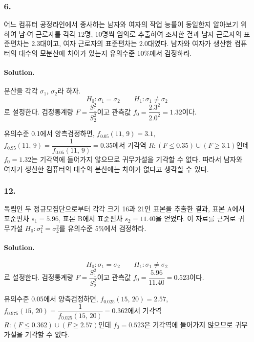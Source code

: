 \subsubsection{6.} 어느 컴퓨터 공정라인에서 종사하는 남자와 여자의 작업 능률이 동일한지 알아보기 위하여 남$\cdot$여 근로자를 각각
12명, 10명씩 임의로 추출하여 조사한 결과 남자 근로자의 표준편차는 2.3대이고, 여자 근로자의 표준편차는 2.0대였다. 남자와 여자가 생산한
컴퓨터의 대수의 모분산에 차이가 있는지 유의수준 10\%에서 검정하라.

\paragraph{Solution.} 분산을 각각 $\sigma_1$, $\sigma_2$라 하자.
\[H_0:\sigma_1=\sigma_2 \qquad H_1:\sigma_1\neq\sigma_2\]
로 설정한다. 검정통계량 $F=\dfrac{S_1^2}{S_2^2}$이고 관측값 $f_0=\dfrac{2.3^2}{2.0^2}=1.32$이다.

유의수준 0.1에서 양측검정하면, $f_{0.05}\left(11,\,9\right)=3.1$, $f_{0.95}\left(11,\,9\right)
=\dfrac{1}{f_{0.05}\left(11,\,9\right)}=0.35$에서
기각역 $R:\left(F\leq 0.35\right) \cup \left(F\geq 3.1\right)$인데
$f_0=1.32$는 기각역에 들어가지 않으므로 귀무가설을 기각할 수 없다. 따라서 남자와 여자가 생산한
컴퓨터의 대수의 분산에는 차이가 없다고 생각할 수 있다.

\subsubsection{12.} 독립인 두 정규모집단으로부터 각각 크기 16과 21인 표본을 추출한 결과, 표본 A에서 표준편차 $s_1=5.96$, 
표본 B에서 표준편차 $s_2=11.40$을 얻었다. 이 자료를 근거로 귀무가설 $H_0:\sigma_1^2=\sigma_2^2$를 유의수준 5\%에서 검정하라.

\paragraph{Solution.}
\[H_0:\sigma_1=\sigma_2 \qquad H_1:\sigma_1\neq\sigma_2\]
로 설정한다. 검정통계량 $F=\dfrac{S_1^2}{S_2^2}$이고 관측값 $f_0=\dfrac{5.96}{11.40}=0.523$이다.

유의수준 0.05에서 양측검정하면, $f_{0.025}\left(15,\,20\right)=2.57$, $f_{0.975}\left(15,\,20\right)
=\dfrac{1}{f_{0.025}\left(15,\,20\right)}=0.362$에서
기각역 $R:\left(F\leq 0.362\right) \cup \left(F\geq 2.57\right)$인데
$f_0=0.523$은 기각역에 들어가지 않으므로 귀무가설을 기각할 수 없다.